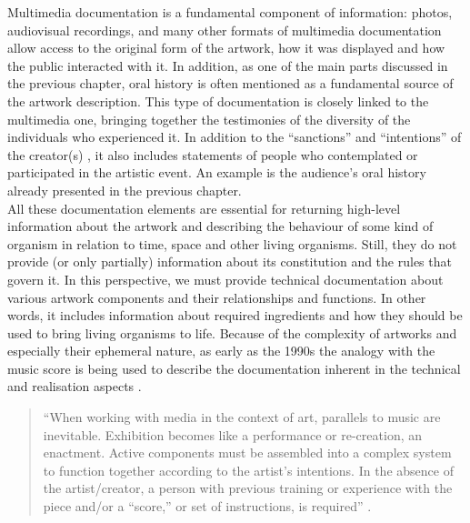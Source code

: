 Multimedia documentation is a fundamental component of information: photos, audiovisual recordings, and many other formats of multimedia documentation allow access to the original form of the artwork, how it was displayed and how the public interacted with it. In addition, as one of the main parts discussed in the previous chapter, oral history is often mentioned as a fundamental source of the artwork description. This type of documentation is closely linked to the multimedia one, bringing together the testimonies of the diversity of the individuals who experienced it. In addition to the ``sanctions'' \cite{irvin2005artist} and ``intentions'' of the creator(s) \cite{lichtin2016you}, it also includes statements of people who contemplated or participated in the artistic event. An example is the audience’s oral history \cite{costello2005understanding, muller2008experience, muller2008towards, jones2008david} already presented in the previous chapter.\\ 
All these documentation elements are essential for returning high-level information about the artwork and describing the behaviour of some kind of organism in relation to time, space and other living organisms. Still, they do not provide (or only partially) information about its constitution and the rules that govern it. In this perspective, we must provide technical documentation about various artwork components and their relationships and functions. In other words, it includes information about required ingredients and how they should be used to bring living organisms to life. Because of the complexity of artworks and especially their ephemeral nature, as early as the 1990s the analogy with the music score is being used to describe the documentation inherent in the technical and realisation aspects \cite{viola1999permanent, van1999between, laurenson2004management, laurenson2006authenticity, rinehart2007media, macdonald2009scoring, noel2011scripting, caianiello2013materializing, rinehart2014re, van2015documenting, phillips2015reporting}.
\begin{quote}
    “When working with media in the context of art, parallels to music are inevitable. Exhibition becomes like a performance or re-creation, an enactment. Active components must be assembled into a complex system to function together according to the artist’s intentions. In the absence of the artist/creator, a person with previous training or experience with the piece and/or a “score,” or set of instructions, is required” \cite{viola1999permanent}.
\end{quote}
